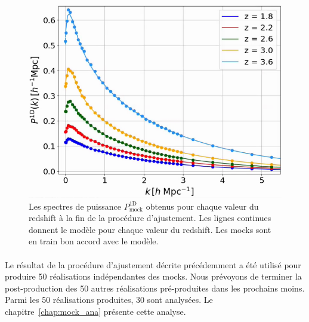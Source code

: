 \begin{figure}
  \centering
  \includegraphics[scale=0.4]{p1d_tuning}
  \caption{Les spectres de puissance $P^{\mathrm{1D}}_{\mathrm{mock}}$ obtenus pour chaque valeur du redshift à la fin de la procédure d'ajustement. Les lignes continues donnent le modèle pour chaque valeur du redshift. Les mocks sont en train bon accord avec le modèle.}
  \label{fig:p1d_tuning}
\end{figure}

\paragraph{}
Le résultat de la procédure d'ajustement décrite précédemment a été utilisé pour produire \num{50} réalisations indépendantes des mocks. Nous prévoyons de terminer la post-production des \num{50} autres réalisations pré-produites dans les prochains moins.
  Parmi les \num{50} réalisations produites, \num{30} sont analysées. Le chapitre~\ref{chap:mock_ana} présente cette analyse.



